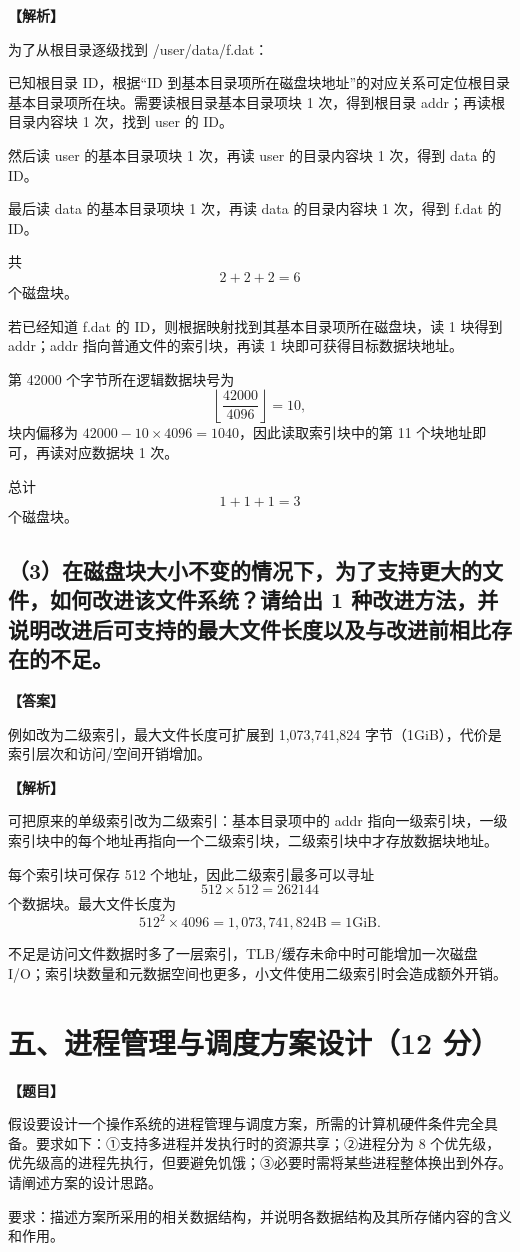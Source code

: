 \documentclass[UTF8,12pt]{ctexart}
\newenvironment{question}{\par\medskip\noindent\textbf{【题目】}\par\smallskip}{\par\medskip}
\newenvironment{explanation}{\par\noindent\textbf{【解析】}\par\smallskip}{\par\medskip}
\newenvironment{answer}{\par\noindent\textbf{【答案】}\par\smallskip}{\par}
\begin{document}
\begin{explanation}
为了从根目录逐级找到 /user/data/f.dat：

已知根目录 ID，根据“ID 到基本目录项所在磁盘块地址”的对应关系可定位根目录基本目录项所在块。需要读根目录基本目录项块 1 次，得到根目录 addr；再读根目录内容块 1 次，找到 user 的 ID。

然后读 user 的基本目录项块 1 次，再读 user 的目录内容块 1 次，得到 data 的 ID。

最后读 data 的基本目录项块 1 次，再读 data 的目录内容块 1 次，得到 f.dat 的 ID。

共
\[
2+2+2=6
\]
个磁盘块。

若已经知道 f.dat 的 ID，则根据映射找到其基本目录项所在磁盘块，读 1 块得到 addr；addr 指向普通文件的索引块，再读 1 块即可获得目标数据块地址。

第 42000 个字节所在逻辑数据块号为
\[
\left\lfloor\frac{42000}{4096}\right\rfloor=10,
\]
块内偏移为 $42000-10\times4096=1040$，因此读取索引块中的第 11 个块地址即可，再读对应数据块 1 次。

总计
\[
1+1+1=3
\]
个磁盘块。
\end{explanation}
\subsection*{（3）在磁盘块大小不变的情况下，为了支持更大的文件，如何改进该文件系统？请给出 1 种改进方法，并说明改进后可支持的最大文件长度以及与改进前相比存在的不足。}
\begin{answer}
例如改为二级索引，最大文件长度可扩展到 1,073,741,824 字节（1GiB），代价是索引层次和访问/空间开销增加。
\end{answer}

\begin{explanation}
可把原来的单级索引改为二级索引：基本目录项中的 addr 指向一级索引块，一级索引块中的每个地址再指向一个二级索引块，二级索引块中才存放数据块地址。

每个索引块可保存 512 个地址，因此二级索引最多可以寻址
\[
512\times512=262144
\]
个数据块。最大文件长度为
\[
512^2\times4096=1,073,741,824\text{B}=1\text{GiB}.
\]

不足是访问文件数据时多了一层索引，TLB/缓存未命中时可能增加一次磁盘 I/O；索引块数量和元数据空间也更多，小文件使用二级索引时会造成额外开销。
\end{explanation}
\section*{五、进程管理与调度方案设计（12 分）}
\begin{question}
假设要设计一个操作系统的进程管理与调度方案，所需的计算机硬件条件完全具备。要求如下：①支持多进程并发执行时的资源共享；②进程分为 8 个优先级，优先级高的进程先执行，但要避免饥饿；③必要时需将某些进程整体换出到外存。请阐述方案的设计思路。

要求：描述方案所采用的相关数据结构，并说明各数据结构及其所存储内容的含义和作用。
\end{question}
\end{document}
